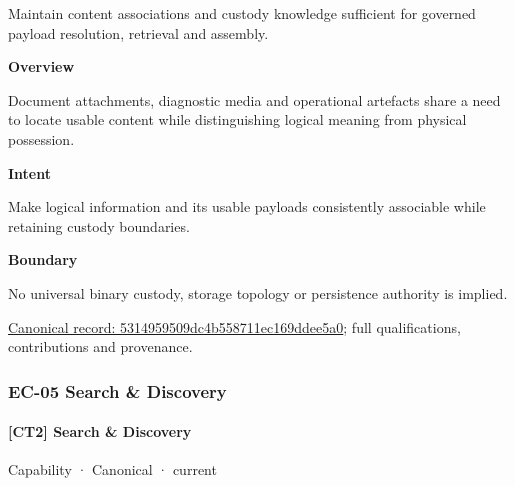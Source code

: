 Maintain content associations and custody knowledge sufficient for governed payload resolution, retrieval and assembly.



\textbf{Overview}



Document attachments, diagnostic media and operational artefacts share a need to locate usable content while distinguishing logical meaning from physical possession.



\textbf{Intent}



Make logical information and its usable payloads consistently associable while retaining custody boundaries.



\textbf{Boundary}



No universal binary custody, storage topology or persistence authority is implied.


{\footnotesize \href{../../../../continuum/strategy/capability/5314959509dc4b558711ec169ddee5a0.md}{Canonical record: 5314959509dc4b558711ec169ddee5a0}; full qualifications, contributions and provenance.}\par
\subsubsection{EC-05 Search \& Discovery}

\paragraph{[CT2] Search \& Discovery}

\label{element:6a45701634f04b43919d9152a61e5f2e}
{\small Capability · Canonical · current}\par

